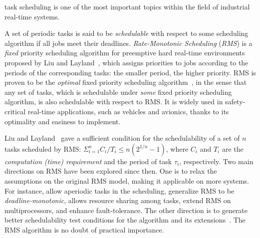 \documentclass[10pt,journal]{IEEEtran}
\begin{document}
% 
% 
% 
% 
 task scheduling is one of the most important
topics within the field of industrial real-time systems.
{A set of periodic tasks is said to be \emph{schedulable} with respect
to some scheduling algorithm if all jobs meet their
deadlines. \emph{Rate-Monotonic Scheduling} (\emph{RMS}) is a
\emph{fixed} priority scheduling algorithm for preemptive hard
real-time environments proposed by Liu and
Layland~\cite{DBLP:journals/jacm/LiuL73}, which assigns priorities to
jobs according to the periods of the corresponding tasks: the smaller
period, the higher priority. RMS is proven to be the \emph{optimal}
fixed priority scheduling algorithm~\cite{DBLP:journals/jacm/LiuL73},
in the sense that any set of tasks, which is schedulable under
\emph{some} fixed priority scheduling algorithm, is also schedulable
with respect to RMS. It is widely used in safety-critical real-time
applications, such as vehicles and avionics, thanks to its optimality
and easiness to implement.

Liu and Layland~\cite{DBLP:journals/jacm/LiuL73} gave a sufficient
condition for the schedulability of a set of $n$ tasks scheduled by
RMS: $\displaystyle\Sigma^n_{i=1}C_i/T_i \le n(2^{1/n}-1)$, where
$C_i$ and $T_i$ are the \emph{computation (time) requirement} and the
period of task $\tau_i$, respectively. Two main directions on RMS have
been explored since then. One is to relax the assumptions on the
original RMS model, making it applicable on more systems.  For
instance,
\cite{DBLP:conf/rtss/LehoczkySS87,DBLP:journals/rts/SpruntSL89,DBLP:conf/rtss/LehoczkyR92,DBLP:journals/tc/StrosniderLS95}
allow aperiodic tasks in the scheduling,
\cite{DBLP:journals/pe/LeungW82,audsley1993deadline} generalize RMS to
be \emph{deadline-monotonic}, \cite{DBLP:journals/tc/ShaRL90} allows
resource sharing among tasks,
\cite{dhall1978real,DBLP:journals/rts/LopezGDG03,DBLP:journals/tpds/LopezDG04,DBLP:journals/tc/BaruahG03}
extend RMS on multiprocessors, and
\cite{DBLP:journals/rts/OhS94,DBLP:journals/rts/GhoshMMS98,DBLP:journals/tpds/BertossiMR99}
enhance fault-tolerance. The other direction is to generate better
schedulability test conditions for the algorithm and its
extensions~\cite{DBLP:conf/rtss/LehoczkySD89,DBLP:conf/rtss/KuoM91,DBLP:journals/tc/BiniBB03,DBLP:journals/rts/LopezGDG03,DBLP:journals/tc/BaruahG03,gardner1999}. The
RMS algorithm is no doubt of practical importance.

}
\end{document}
